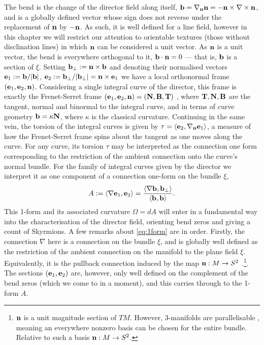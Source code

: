 The bend is the change of the director field along itself, ${\bf b} = \nabla_{{\bf n}}{\bf n}=-{\bf n}\times\nabla\times{\bf n}$, and is a globally defined vector whose sign does not reverse under the replacement of ${\bf n}$ by $-{\bf n}$. As such, it is well defined for a line field, however in this chapter we will restrict our attention to orientable textures (those without disclination lines) in which $\mathbf{n}$ can be considered a unit vector. As ${\bf n}$ is a unit vector, the bend is everywhere orthogonal to it, ${\bf b}\cdot{\bf n}=0$ --- that is, $\mathbf{b}$ is a section of $\xi$. Setting ${\bf b}_\perp:={\bf n}\times{\mathbf{b}}$ and denoting their normalised vectors ${\bf e}_1 := \mathbf{b}/|\mathbf{b}|$, $\mathbf{e}_2 := \mathbf{b}_\perp/|\mathbf{b}_\perp| = \mathbf{n} \times \mathbf{e}_1$ we have a local orthonormal frame $({\bf e}_1, {\bf e}_2, {\bf n})$. Considering a single integral curve of the director, this frame is exactly the Frenet-Serret frame $({\bf e}_1, {\bf e}_2,{\bf n}) = (\mathbf{N}, \mathbf{B}, \mathbf{T})$ \citep{DoCarmoBook}, where $\mathbf{T}, \mathbf{N}, \mathbf{B}$ are the tangent, normal and binormal to the integral curve, and in terms of curve geometry $\mathbf{b} = \kappa \mathbf{N}$, where $\kappa$ is the classical curvature. Continuing in the same vein, the torsion of the integral curves is given by $\tau  = \langle \mathbf{e}_2 , \nabla_{\mathbf{n}} \mathbf{e}_1 \rangle $, a measure of how the Frenet-Serret frame spins about the tangent as one moves along the curve. For any curve, its torsion $\tau$ may be interpreted as the connection one form corresponding to the restriction of the ambient connection onto the curve's normal bundle. For the family of integral curves given by the director we interpret it as one component of a connection one-form on the bundle $\xi$,  
\begin{equation}
    A := \langle \nabla \mathbf{e}_1 ,\mathbf{e}_2 \rangle = \frac{\langle \nabla \mathbf{b} ,\mathbf{b}_\perp \rangle}{\langle \mathbf{b},\mathbf{b} \rangle}. 
    \label{eq:1form}
\end{equation}
This 1-form and its associated curvature $\Omega = dA$ will enter in a fundamental way into the characterisation of the director field, orienting bend zeros and giving a count of Skyrmions. A few remarks about \eqref{eq:1form} are in order. Firstly, the connection $\nabla$ here is a connection on the bundle $\xi$, and is globally well defined as the restriction of the ambient connection on the manifold to the plane field $\xi$. Equivalently, it is the pullback connection induced by the map ${\bf n}: M \rightarrow S^2$ \citep{Lee1996}.\footnote{$\mathbf{n}$ is a unit magnitude section of $TM$. However, 3-manifolds are parallelisable \citep{Geiges2009}, meaning an everywhere nonzero basis can be chosen for the entire bundle. Relative to such a basis $\mathbf{n}: M \rightarrow S^2$.}. The sections $(\mathbf{e}_1,\mathbf{e}_2)$ are, however, only well defined on the complement of the bend zeros (which we come to in a moment), and this carries through to the 1-form $A$. 

